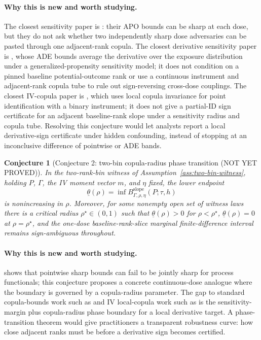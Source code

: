 \documentclass[11pt]{article}
\theoremstyle{definition}
\theoremstyle{plain}
\newtheorem{conjecture}{Conjecture}
\theoremstyle{remark}
\begin{document}
\paragraph{Why this is new and worth studying.}
The closest sensitivity paper is \citet{BaitairianSebastienJreichKatsahianGuilloux2025}: their APO bounds can be sharp at each dose, but they do not ask whether two independently sharp dose adversaries can be pasted through one adjacent-rank copula.  The closest derivative sensitivity paper is \citet{Zhang2025ADE}, whose ADE bounds average the derivative over the exposure distribution under a generalized-propensity sensitivity model; it does not condition on a pinned baseline potential-outcome rank or use a continuous instrument and adjacent-rank copula tube to rule out sign-reversing cross-dose couplings.  The closest IV-copula paper is \citet{ChernozhukovFernandezValHanWuthrich2024}, which uses local copula invariance for point identification with a binary instrument; it does not give a partial-ID sign certificate for an adjacent baseline-rank slope under a sensitivity radius and copula tube.  Resolving this conjecture would let analysts report a local derivative-sign certificate under hidden confounding, instead of stopping at an inconclusive difference of pointwise or ADE bands.

\begin{conjecture}[Conjecture 2: two-bin copula-radius phase transition (NOT YET PROVED)]\label{conj:rho-threshold}
In the two-rank-bin witness of Assumption~\ref{ass:two-bin-witness}, holding \(P\), \(\Gamma\), the IV moment vector \(m\), and \(\eta\) fixed, the lower endpoint
\[
\underline\theta(\rho)=\inf B_{\Gamma,\rho,\eta}^{\mathrm{slope}}(P;\tau,h)
\]
is nonincreasing in \(\rho\).  Moreover, for some nonempty open set of witness laws there is a critical radius \(\rho^\star\in(0,1)\) such that \(\underline\theta(\rho)>0\) for \(\rho<\rho^\star\), \(\underline\theta(\rho)=0\) at \(\rho=\rho^\star\), and the one-dose baseline-rank-slice marginal finite-difference interval remains sign-ambiguous throughout.
\end{conjecture}

\paragraph{Why this is new and worth studying.}
\citet{FirpoRidder2019} shows that pointwise sharp bounds can fail to be jointly sharp for process functionals; this conjecture proposes a concrete continuous-dose analogue where the boundary is governed by a copula-radius parameter.  The gap to standard copula-bounds work such as \citet{FanGuerreZhu2017} and IV local-copula work such as \citet{ChernozhukovFernandezValHanWuthrich2024} is the sensitivity-margin plus copula-radius phase boundary for a local derivative target.  A phase-transition theorem would give practitioners a transparent robustness curve: how close adjacent ranks must be before a derivative sign becomes certified.
\end{document}
